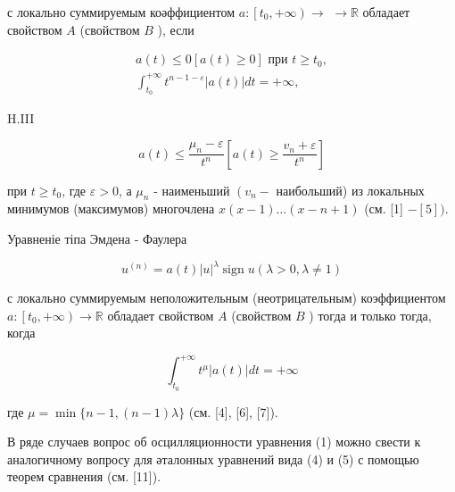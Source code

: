 \documentclass[10pt]{article}
\begin{document}
с локально суммируемым коәффициентом $a:\left[t_{0},+\infty\right) \rightarrow$ $\rightarrow \mathbb{R}$ обладает свойством $A$ (свойством $B$ ), если



\[

\begin{gathered}

a(t) \leqslant 0[a(t) \geqslant 0] \text { при } t \geqslant t_{0}, \\

\int_{t_{0}}^{+\infty} t^{n-1-\varepsilon}|a(t)| d t=+\infty,

\end{gathered}

\]



H.III



\[

a(t) \leqslant \frac{\mu_{n}-\varepsilon}{t^{n}}\left[a(t) \geqslant \frac{v_{n}+\varepsilon}{t^{n}}\right]

\]



при $t \geqslant t_{0}$, где $\varepsilon>0$, а $\mu_{n}$ - наименьший $\left(v_{n}-\right.$ наибольший) из локальных минимумов (максимумов) многочлена $x(x-1) \ldots(x-n+1)$ (см. [1] $-[5])$.



Уравненіе тіпа Эмдена - Фаулера



\[

u^{(n)}=a(t)|u|^{\lambda} \operatorname{sign} u(\lambda>0, \lambda \neq 1)

\]



с локально суммируемым неположительным (неотрицательным) коэффициентом $a:\left[t_{0},+\infty\right) \rightarrow \mathbb{R}$ обладает свойством $A$ (свойством $B$ ) тогда и только тогда, когда



\[

\int_{t_{0}}^{+\infty} t^{\mu}|a(t)| d t=+\infty

\]



где $\mu=\min \{n-1,(n-1) \lambda\}$ (см. [4], [6], [7]).



В ряде случаев вопрос об осцилляционности уравнения (1) можно свести к аналогичному вопросу для әталонных уравнений вида (4) и (5) с помощью теорем сравнения (см. [11]).
\end{document}
